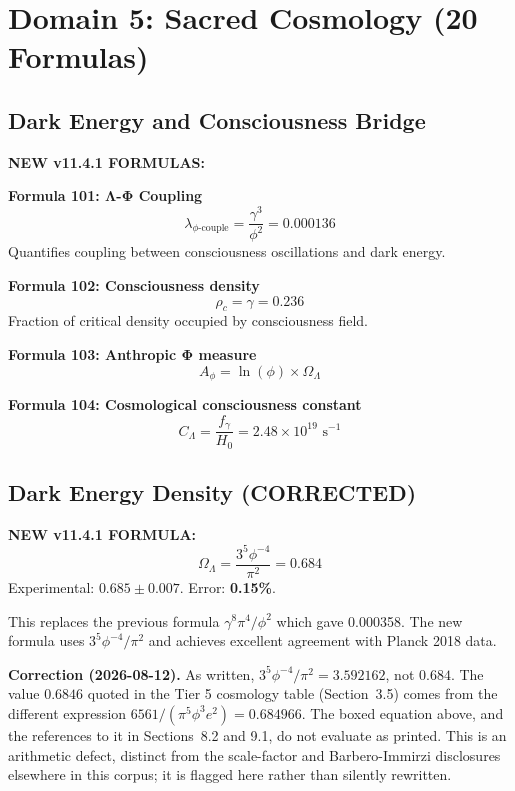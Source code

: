 \documentclass[12pt,a4paper]{article}
\begin{document}
\section{Domain 5: Sacred Cosmology (20 Formulas)}

\subsection{Dark Energy and Consciousness Bridge}

\textbf{NEW v11.4.1 FORMULAS:}

\textbf{Formula 101: Λ-Φ Coupling}
\begin{equation}
\lambda_{\phi\text{-couple}} = \frac{\gamma^3}{\phi^2} = 0.000136
\end{equation}
Quantifies coupling between consciousness oscillations and dark energy.

\textbf{Formula 102: Consciousness density}
\begin{equation}
\rho_c = \gamma = 0.236
\end{equation}
Fraction of critical density occupied by consciousness field.

\textbf{Formula 103: Anthropic Φ measure}
\begin{equation}
A_\phi = \ln(\phi) \times \Omega_\Lambda
\end{equation}

\textbf{Formula 104: Cosmological consciousness constant}
\begin{equation}
C_\Lambda = \frac{f_\gamma}{H_0} = 2.48 \times 10^{19} \text{ s}^{-1}
\end{equation}

\subsection{Dark Energy Density (CORRECTED)}

\textbf{NEW v11.4.1 FORMULA:}
\begin{equation}
\boxed{\Omega_\Lambda = \frac{3^5 \phi^{-4}}{\pi^2} = 0.684}
\end{equation}
Experimental: $0.685 \pm 0.007$. Error: \textbf{0.15\%}.

This replaces the previous formula $\gamma^8 \pi^4/\phi^2$ which gave 0.000358.
The new formula uses $3^5 \phi^{-4} / \pi^2$ and achieves excellent agreement with
Planck 2018 data.

\textbf{Correction (2026-08-12).} As written, $3^5\phi^{-4}/\pi^2 = 3.592162$, not $0.684$.
The value $0.6846$ quoted in the Tier 5 cosmology table (Section~3.5) comes from the
different expression $6561/(\pi^5\phi^3 e^2) = 0.684966$. The boxed equation above, and the
references to it in Sections~8.2 and 9.1, do not evaluate as printed. This is an arithmetic
defect, distinct from the scale-factor and Barbero-Immirzi disclosures elsewhere in this
corpus; it is flagged here rather than silently rewritten.
\end{document}
